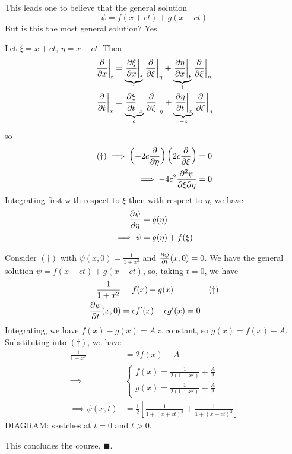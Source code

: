 \documentclass{../../template/note}
\begin{document}
    This leads one to believe that the general solution
    \[
        \psi = f(x+ct) + g(x-ct)
    \]
    But is this the most general solution? Yes.

    Let \(\xi = x + ct\), \(\eta = x - ct\). Then
    \begin{align*}
        \pd[t]{}{x} &= \underbrace{\pd[t]{\xi}{x}}_1 \pd[\eta]{}{\xi} + \underbrace{\pd[t]{\eta}{x}}_1 \pd[\eta]{}{\xi} \\
        \pd[x]{}{t} &= \underbrace{\pd[x]{\xi}{t}}_{c} \pd[\eta]{}{\xi} + \underbrace{\pd[x]{\eta}{t}}_{-c} \pd[\eta]{}{\xi} 
    \end{align*}
    so
    \begin{align*}
        (\dagger) \implies \left(-2c \pd{}{\eta}\right)\left(2c \pd{}{\xi}\right) &= 0 \\
        \implies -4c^2 \pd{^2\psi}{\xi \partial \eta} &= 0
    \end{align*}
    Integrating first with respect to \(\xi\) then with respect to \(\eta\), we have
    \begin{align*}
        \pd \psi \eta &= \tilde g(\eta) \\
        \implies \psi &= g(\eta) + f(\xi)
    \end{align*}
    
    \begin{example}
        Consider \((\dagger)\) with \(\psi(x, 0) = \frac{1}{1+x^2}\) and \(\pd \psi t (x, 0) = 0\). We have the general solution \(\psi = f(x+ct) + g(x-ct)\), so, taking \(t=0\), we have
        \begin{align*}
            \frac{1}{1+x^2} &= f(x) + g(x) && (\ddagger) \\
            \pd \psi t (x, 0) &= cf'(x) - cg'(x) = 0
        \end{align*}
        Integrating, we have \(f(x) - g(x) = A\) a constant, so \(g(x) = f(x) - A\). Substituting into \((\ddagger)\), we have
        \begin{align*}
            \frac{1}{1+x^2} &= 2f(x) - A \\
            \implies &
            \begin{cases}
                f(x) = \frac{1}{2(1+x^2)} + \frac{A}{2} \\
                g(x) = \frac{1}{2(1+x^2)} - \frac{A}{2}
            \end{cases} \\
            \implies \psi(x, t) &= \frac{1}{2} \left[\frac{1}{1+(x+ct)^2}+\frac{1}{1+(x-ct)^2}\right]
        \end{align*}
        DIAGRAM: sketches at \(t=0\) and \(t>0\).
    \end{example}
    
    This concludes the course. \(\blacksquare\).
    
    
    
    
    
\end{document}
